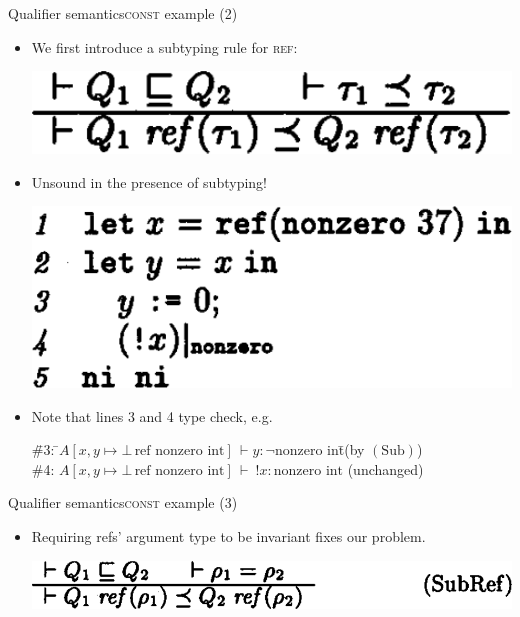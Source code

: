 \documentclass{beamer}
\begin{document}
\begin{frame}{Qualifier semantics}{\textsc{const} example (2)}
  \begin{itemize}
  \item We first introduce a subtyping rule for \textsc{ref}:
    \begin{center}
    \includegraphics[scale=0.29]{paper_ref_unsound.png}
    \end{center}
  \item<2-> Unsound in the presence of subtyping!
    \begin{center}
    \includegraphics[scale=0.3]{paper_ref_unsoundsample.png}
    \end{center}
  \item<3->[$\Rightarrow$] Note that lines 3 and 4 type check, e.g.\
    \begin{minipage}[t]{0.3\textwidth}
    \begin{tabbing}
    \=\#3: \=$A[x, y \mapsto \bot\,\text{ref nonzero int}]\,\vdash y : \neg\text{nonzero int}$\quad \=\small(by $(\text{Sub})$)\\
    \>\#4: \>$A[x, y \mapsto \bot\,\text{ref nonzero int}]\,\vdash\ !x : \text{nonzero int}$ \>\small(unchanged)
    \end{tabbing}
    \end{minipage}
  \end{itemize}
\end{frame}

\begin{frame}{Qualifier semantics}{\textsc{const} example (3)}
  \begin{itemize}
  \item Requiring refs' argument type to be invariant fixes our problem.
    \begin{center}
    \includegraphics[scale=0.29]{paper_ref_sound.png}
    \end{center}
  \end{itemize}
\end{frame}
\end{document}

